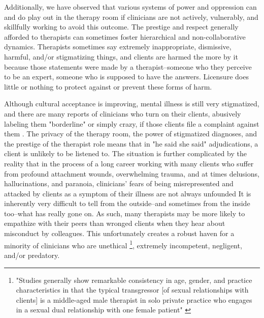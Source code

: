 \documentclass[12pt,letterpaper]{book}
\begin{document}
Additionally, we have observed that various systems of power and oppression can and do play out in the therapy room if clinicians are not actively, vulnerably, and skillfully working to avoid this outcome. The prestige and respect generally afforded to therapists can sometimes foster hierarchical and non-collaborative dynamics. Therapists sometimes say extremely inappropriate, dismissive, harmful, and/or stigmatizing things, and clients are harmed the more by it because those statements were made by a therapist–someone who they perceive to be an expert, someone who is supposed to have the answers. Licensure does little or nothing to protect against or prevent these forms of harm. 

Although cultural acceptance is improving, mental illness is still very stigmatized, and there are many reports of clinicians who turn on their clients, abusively labeling them "borderline" or simply crazy, if those clients file a complaint against them \cite{hook2018boundary}.
The privacy of the therapy room, the power of stigmatized diagnoses, and the prestige of the therapist role means that in "he said she said" adjudications, a client is unlikely to be listened to. The situation is further complicated by the reality that in the process of a long career working with many clients who suffer from profound attachment wounds, overwhelming trauma, and at times delusions, hallucinations, and paranoia, clinicians' fears of being misrepresented and attacked by clients as a symptom of their illness are not always unfounded \cite{gutheil1991patients,williams2000victimized} It is inherently very difficult to tell from the outside–and sometimes from the inside too–what has really gone on. As such, many therapists may be more likely to empathize with their peers \cite{hook2018boundary} than wronged clients when they hear about misconduct by colleagues. This unfortunately creates a robust haven for a minority of clinicians who are unethical \footnote{"Studies generally show remarkable consistency in age, gender, and practice characteristics in that the typical transgressor [of sexual relationships with clients] is a middle-aged male therapist in solo private practice who engages in a sexual dual relationship with one female patient" \cite{sexViolations}}, extremely incompetent, negligent, and/or predatory.
\end{document}

